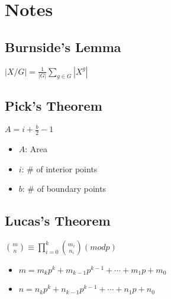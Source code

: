 \section{Notes}
    \subsection{Burnside's Lemma}
        \large $\left | X / G \right | = \frac{1}{\left | G \right |}\sum_{g \in G}\left | X^g \right |$
    \subsection{Pick's Theorem}
        \large $A = i + \frac{b}{2} - 1$
        \small
        \begin{itemize}
            \item $A$: Area
            \item $i$: \# of interior points
            \item $b$: \# of boundary points
        \end{itemize}
    \subsection{Lucas's Theorem}
        \large $\binom{m}{n}\equiv \prod_{i=0}^k \binom{m_i}{n_i} (mod p)$
        \small
        \begin{itemize}
            \item $m = m_kp^k + m_{k-1}p^{k-1} + \cdots + m_1p + m_0$
            \item $n = n_kp^k + n_{k-1}p^{k-1} + \cdots + n_1p + n_0$
        \end{itemize}

        
